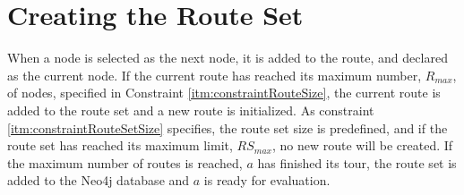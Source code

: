 \section{Creating the Route Set}
\label{sec:algoCreatingRouteSet}

When a node is selected as the next node, it is added to the route, and declared as the current node. If the current route has reached its maximum number, $R_{max}$, of nodes, specified in Constraint \vref{itm:constraintRouteSize}, the current route is added to the route set and a new route is initialized. As constraint \vref{itm:constraintRouteSetSize} specifies, the route set size is predefined, and if the route set has reached its maximum limit, $RS_{max}$, no new route will be created. If the maximum number of routes is reached, $a$ has finished its tour, the route set is added to the Neo4j database and $a$ is ready for evaluation. 
